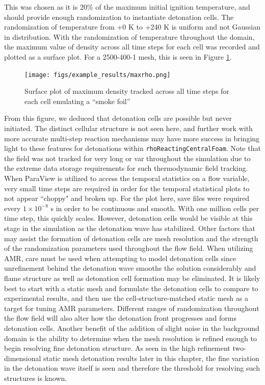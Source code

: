 \noindent This was chosen as it is 20\% of the maximum initial ignition temperature, and should provide enough randomization to instantiate detonation cells. The randomization of temperature from +0 K to +240 K is uniform and not Gaussian in distribution. With the randomization of temperature throughout the domain, the maximum value of density across all time steps for each cell was recorded and plotted as a surface plot. 
For a 2500-400-1 mesh, this is seen in Figure \ref{fig:maxrho}.
\begin{figure}[h]
\centering
\texttt{[image: figs/example\_results/maxrho.png]}
\caption{Surface plot of maximum density tracked across all time steps for each cell emulating a ``smoke foil''}
\label{fig:maxrho}
\end{figure}
From this figure, we deduced that detonation cells are possible but never initiated. The distinct cellular structure is not seen here, and further work with more accurate multi-step reaction mechanisms may have more success in bringing light to these features for detonations within \verb|rhoReactingCentralFoam|. Note that the field was not tracked for very long or var throughout the simulation due to the extreme data storage requirements for such thermodynamic field tracking. When ParaView is utilized to access the temporal statistics on a flow variable, very small time steps are required in order for the temporal statistical plots to not appear ``choppy" and broken up. For the plot here, save files were required every \(1 \times 10^{ - 8}\) s in order to be continuous and smooth. With one million cells per time step, this quickly scales. However, detonation cells would be visible at this stage in the simulation as the detonation wave has stabilized. Other factors that may assist the formation of detonation cells are mesh resolution and the strength of the randomization parameters used throughout the flow field. When utilizing AMR, care must be used when attempting to model detonation cells since unrefinement behind the detonation wave smooths the solution considerably and flame structure as well as detonation cell formation may be eliminated. It is likely best to start with a static mesh and formulate the detonation cells to compare to experimental results, and then use the cell-structure-matched static mesh as a target for tuning AMR parameters. Different ranges of randomization throughout the flow field will also alter how the detonation front progresses and forms detonation cells. Another benefit of the addition of slight noise in the background domain is the ability to determine when the mesh resolution is refined enough to begin resolving fine detonation structure. As seen in the high refinement two-dimensional static mesh detonation results later in this chapter, the fine variation in the detonation wave itself is seen and therefore the threshold for resolving such structures is known. 



